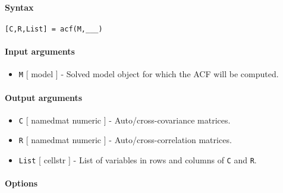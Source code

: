 


	\paragraph{Syntax}\label{syntax}

\begin{verbatim}
[C,R,List] = acf(M,___)
\end{verbatim}

\paragraph{Input arguments}\label{input-arguments}

\begin{itemize}
\itemsep1pt\parskip0pt
\item
  \texttt{M} {[} model {]} - Solved model object for which the ACF will
  be computed.
\end{itemize}

\paragraph{Output arguments}\label{output-arguments}

\begin{itemize}
\item
  \texttt{C} {[} namedmat \textbar{} numeric {]} - Auto/cross-covariance
  matrices.
\item
  \texttt{R} {[} namedmat \textbar{} numeric {]} -
  Auto/cross-correlation matrices.
\item
  \texttt{List} {[} cellstr {]} - List of variables in rows and columns
  of \texttt{C} and \texttt{R}.
\end{itemize}

\paragraph{Options}\label{options}

